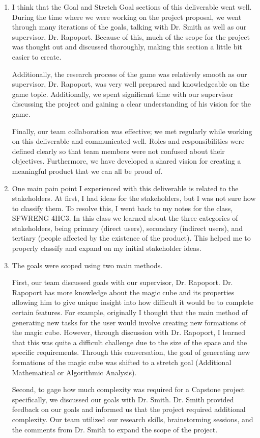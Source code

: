 \documentclass{article}
\begin{document}
\begin{enumerate}
    \item I think that the Goal and Stretch Goal sections of this deliverable went well. During the time where we were working on the project proposal, we went through many iterations of the goals, talking with Dr. Smith as well as our supervisor, Dr. Rapoport. Because of this, much of the scope for the project was thought out and discussed thoroughly, making this section a little bit easier to create.

    Additionally, the research process of the game was relatively smooth as our supervisor, Dr. Rapoport, was very well prepared and knowledgeable on the game topic. Additionally, we spent significant time with our supervisor discussing the project and gaining a clear understanding of his vision for the game.

    Finally, our team collaboration was effective; we met regularly while working on this deliverable and communicated well. Roles and responsibilities were defined clearly so that team members were not confused about their objectives. Furthermore, we have developed a shared vision for creating a meaningful product that we can all be proud of.

    \item One main pain point I experienced with this deliverable is related to the stakeholders. At first, I had ideas for the stakeholders, but I was not sure how to classify them. To resolve this, I went back to my notes for the class, SFWRENG 4HC3. In this class we learned about the three categories of stakeholders, being primary (direct users), secondary (indirect users), and tertiary (people affected by the existence of the product). This helped me to properly classify and expand on my initial stakeholder ideas.
    
    \item The goals were scoped using two main methods.

    First, our team discussed goals with our supervisor, Dr. Rapoport. Dr. Rapoport has more knowledge about the magic cube and its properties allowing him to give unique insight into how difficult it would be to complete certain features. For example, originally I thought that the main method of generating new tasks for the user would involve creating new formations of the magic cube. However, through discussion with Dr. Rapoport, I learned that this was quite a difficult challenge due to the size of the space and the specific requirements. Through this conversation, the goal of generating new formations of the magic cube was shifted to a stretch goal (Additional Mathematical or Algorithmic Analysis).

    Second, to gage how much complexity was required for a Capstone project specifically, we discussed our goals with Dr. Smith. Dr. Smith provided feedback on our goals and informed us that the project required additional complexity. Our team utilized our research skills, brainstorming sessions, and the comments from Dr. Smith to expand the scope of the project.
\end{enumerate}
\end{document}
